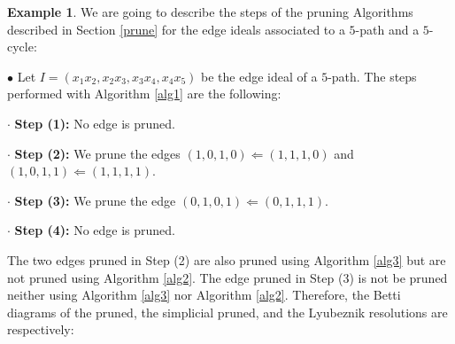 \documentclass[12pt]{amsart}
\theoremstyle{definition}
\newtheorem{example}[theorem]{Example}
\theoremstyle{remark}
\numberwithin{equation}{section}
\begin{document}
\begin{example}\label{ex5path5cycle}
We are going to describe the steps of the pruning Algorithms described in Section \ref{prune}
for the edge ideals associated to a $5$-path and a $5$-cycle:
%

%

\vskip 2mm

$\bullet$ Let  $I=({x}_{1} {x}_{2}, {x}_{2} {x}_{3}, {x}_{3} {x}_{4}, {x}_{4} {x}_{5})$ be the edge ideal
of a $5$-path. The steps performed with Algorithm \ref{alg1} are the following:

\vskip 2mm

\noindent $\cdot$ {\bf Step (1):} No edge is pruned.


\noindent $\cdot$ {\bf Step (2):} We prune the edges $(1,0,1,0) \Leftarrow (1,1,1,0)$ and $(1,0,1,1) \Leftarrow (1,1,1,1)$.


\noindent $\cdot$ {\bf Step (3):} We prune the edge $(0,1,0,1) \Leftarrow (0,1,1,1)$.


\noindent $\cdot$ {\bf Step (4):} No edge is pruned.


\vskip 2mm

The two edges pruned in Step (2) are also pruned using Algorithm \ref{alg3} but are
not pruned using Algorithm \ref{alg2}. The edge pruned in Step (3) is not be pruned neither
using Algorithm \ref{alg3} nor Algorithm \ref{alg2}. Therefore, the Betti diagrams of the pruned, the simplicial pruned,
and the Lyubeznik resolutions
are  respectively:


\vskip 2mm


\end{example}
\end{document}

